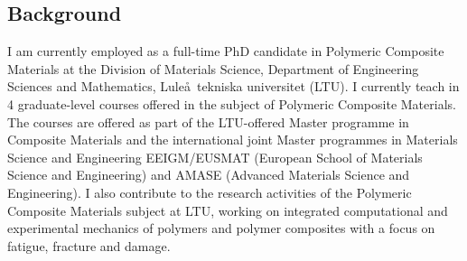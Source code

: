 \documentclass[
  a4paper, 
]{fortysecondscv}
\begin{document}
\makefrontsidebar

\subsection{Background}
I am currently employed as a full-time PhD candidate in Polymeric Composite Materials at the Division of Materials Science, Department of Engineering Sciences and Mathematics, Lule\aa\ tekniska universitet (LTU). I currently teach in 4 graduate-level courses offered in the subject of Polymeric Composite Materials. The courses are offered as part of the LTU-offered Master programme in Composite Materials and the international joint Master programmes in Materials Science and Engineering EEIGM/EUSMAT (European School of Materials Science and Engineering) and AMASE (Advanced Materials Science and Engineering). I also contribute to the research activities of the Polymeric Composite Materials subject at LTU, working on integrated computational and experimental mechanics of polymers and polymer composites with a focus on fatigue, fracture and damage.
\end{document}
